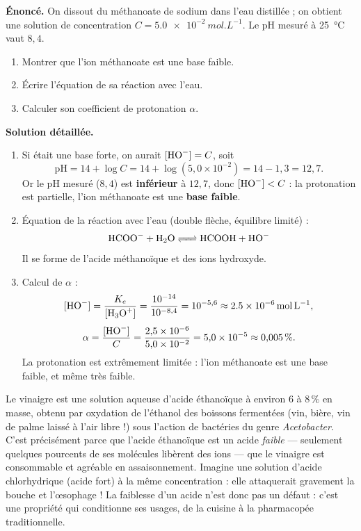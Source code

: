 \documentclass[11pt]{article}
\begin{document}
\begin{exoresolu}
\textbf{Énoncé.} On dissout du méthanoate de sodium  dans l'eau distillée ; on obtient une solution de concentration $C = \SI{5,0e-2}{mol.L^{-1}}$. Le pH mesuré à \SI{25}{\celsius} vaut $8{,}4$.
\begin{enumerate}
\item Montrer que l'ion méthanoate  est une base faible.
\item Écrire l'équation de sa réaction avec l'eau.
\item Calculer son coefficient de protonation $\alpha$.
\end{enumerate}
\tcblower
\textbf{Solution détaillée.}
\begin{enumerate}
\item Si  était une base forte, on aurait $[\ce{HO-}] = C$, soit
\[
\mathrm{pH} = 14 + \log C = 14 + \log(5{,}0\times 10^{-2}) = 14 - 1{,}3 = 12{,}7.
\]
Or le pH mesuré ($8{,}4$) est \textbf{inférieur} à $12{,}7$, donc $[\ce{HO-}] < C$ : la protonation est partielle, l'ion méthanoate est une \textbf{base faible}.
\item Équation de la réaction avec l'eau (double flèche, équilibre limité) :
\[
\ce{HCOO- + H2O <=> HCOOH + HO-}
\]
Il se forme de l'acide méthanoïque  et des ions hydroxyde.
\item Calcul de $\alpha$ :
\[
[\ce{HO-}] = \frac{K_e}{[\ce{H3O+}]} = \frac{10^{-14}}{10^{-8{,}4}} = 10^{-5{,}6} \approx \SI{2,5e-6}{mol.L^{-1}},
\]
\[
\alpha = \frac{[\ce{HO-}]}{C} = \frac{2{,}5\times 10^{-6}}{5{,}0\times 10^{-2}} = 5{,}0\times 10^{-5} \approx 0{,}005\,\%.
\]
La protonation est extrêmement limitée : l'ion méthanoate est une base faible, et même très faible.
\end{enumerate}
\end{exoresolu}

\begin{savaistu}
Le vinaigre est une solution aqueuse d'acide éthanoïque à environ $6$ à $8\,\%$ en masse, obtenu par oxydation de l'éthanol des boissons fermentées (vin, bière, vin de palme laissé à l'air libre !) sous l'action de bactéries du genre \emph{Acetobacter}. C'est précisément parce que l'acide éthanoïque est un acide \emph{faible} — seulement quelques pourcents de ses molécules libèrent des ions  — que le vinaigre est consommable et agréable en assaisonnement. Imagine une solution d'acide chlorhydrique (acide fort) à la même concentration : elle attaquerait gravement la bouche et l'œsophage ! La \og faiblesse \fg{} d'un acide n'est donc pas un défaut : c'est une propriété qui conditionne ses usages, de la cuisine à la pharmacopée traditionnelle.
\end{savaistu}
\end{document}
